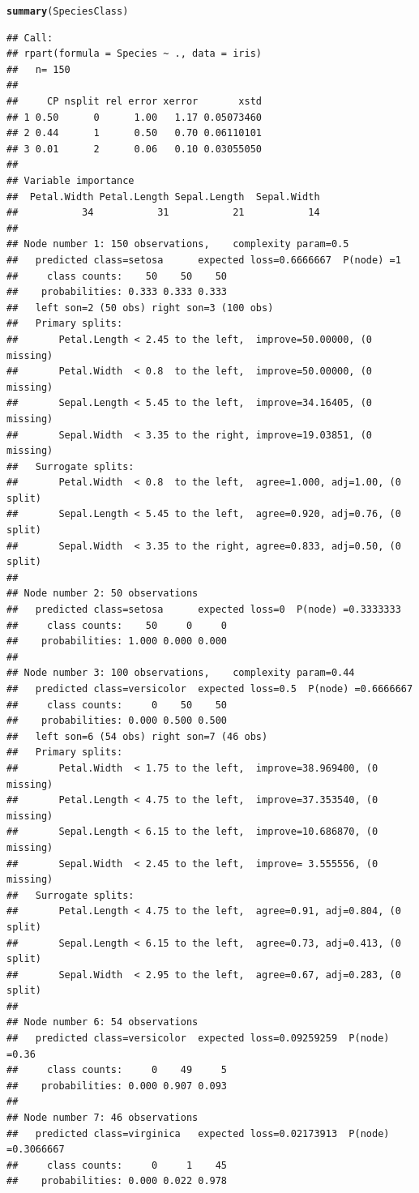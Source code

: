 \documentclass[12pt]{article}\usepackage[]{graphicx}\usepackage[]{xcolor}
\makeatletter
\newcommand{\hldef}[1]{\textcolor[rgb]{0.345,0.345,0.345}{#1}}%
\newcommand{\hlkwd}[1]{\textcolor[rgb]{0.737,0.353,0.396}{\textbf{#1}}}%
\newenvironment{kframe}{%
 \def\at@end@of@kframe{}%
 \ifinner\ifhmode%
  \def\at@end@of@kframe{\end{minipage}}%
  \begin{minipage}{\columnwidth}%
 \fi\fi%
 \def\FrameCommand##1{\hskip\@totalleftmargin \hskip-\fboxsep
 \colorbox{shadecolor}{##1}\hskip-\fboxsep
     \hskip-\linewidth \hskip-\@totalleftmargin \hskip\columnwidth}%
 \MakeFramed {\advance\hsize-\width
   \@totalleftmargin\z@ \linewidth\hsize
   \@setminipage}}%
 {\par\unskip\endMakeFramed%
 \at@end@of@kframe}
\newenvironment{knitrout}{}{} %
\makeatother
\begin{document}
\begin{knitrout}
\begin{kframe}
{\ttfamily\noindent\bfseries{}}\begin{alltt}
\hlkwd{summary}\hldef{(SpeciesClass)}
\end{alltt}
\begin{verbatim}
## Call:
## rpart(formula = Species ~ ., data = iris)
##   n= 150 
## 
##     CP nsplit rel error xerror       xstd
## 1 0.50      0      1.00   1.17 0.05073460
## 2 0.44      1      0.50   0.70 0.06110101
## 3 0.01      2      0.06   0.10 0.03055050
## 
## Variable importance
##  Petal.Width Petal.Length Sepal.Length  Sepal.Width 
##           34           31           21           14 
## 
## Node number 1: 150 observations,    complexity param=0.5
##   predicted class=setosa      expected loss=0.6666667  P(node) =1
##     class counts:    50    50    50
##    probabilities: 0.333 0.333 0.333 
##   left son=2 (50 obs) right son=3 (100 obs)
##   Primary splits:
##       Petal.Length < 2.45 to the left,  improve=50.00000, (0 missing)
##       Petal.Width  < 0.8  to the left,  improve=50.00000, (0 missing)
##       Sepal.Length < 5.45 to the left,  improve=34.16405, (0 missing)
##       Sepal.Width  < 3.35 to the right, improve=19.03851, (0 missing)
##   Surrogate splits:
##       Petal.Width  < 0.8  to the left,  agree=1.000, adj=1.00, (0 split)
##       Sepal.Length < 5.45 to the left,  agree=0.920, adj=0.76, (0 split)
##       Sepal.Width  < 3.35 to the right, agree=0.833, adj=0.50, (0 split)
## 
## Node number 2: 50 observations
##   predicted class=setosa      expected loss=0  P(node) =0.3333333
##     class counts:    50     0     0
##    probabilities: 1.000 0.000 0.000 
## 
## Node number 3: 100 observations,    complexity param=0.44
##   predicted class=versicolor  expected loss=0.5  P(node) =0.6666667
##     class counts:     0    50    50
##    probabilities: 0.000 0.500 0.500 
##   left son=6 (54 obs) right son=7 (46 obs)
##   Primary splits:
##       Petal.Width  < 1.75 to the left,  improve=38.969400, (0 missing)
##       Petal.Length < 4.75 to the left,  improve=37.353540, (0 missing)
##       Sepal.Length < 6.15 to the left,  improve=10.686870, (0 missing)
##       Sepal.Width  < 2.45 to the left,  improve= 3.555556, (0 missing)
##   Surrogate splits:
##       Petal.Length < 4.75 to the left,  agree=0.91, adj=0.804, (0 split)
##       Sepal.Length < 6.15 to the left,  agree=0.73, adj=0.413, (0 split)
##       Sepal.Width  < 2.95 to the left,  agree=0.67, adj=0.283, (0 split)
## 
## Node number 6: 54 observations
##   predicted class=versicolor  expected loss=0.09259259  P(node) =0.36
##     class counts:     0    49     5
##    probabilities: 0.000 0.907 0.093 
## 
## Node number 7: 46 observations
##   predicted class=virginica   expected loss=0.02173913  P(node) =0.3066667
##     class counts:     0     1    45
##    probabilities: 0.000 0.022 0.978
\end{verbatim}
\end{kframe}
\end{knitrout}
\end{document}
